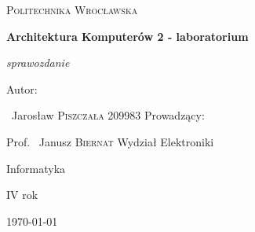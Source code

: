 ﻿%



\begin{titlepage}
\centering
	{\scshape\LARGE Politechnika Wrocławska \par}
	\vspace{6cm}
	{\huge\bfseries Architektura Komputerów 2 - laboratorium\par}
	\vspace{0.5cm}
	{\Large\itshape sprawozdanie\par}
    \vspace{2cm}
    \vfill
	Autor:\par
	~Jarosław \textsc{Piszczała} 209983
	\vfill
	Prowadzący:\par
	Prof. ~Janusz \textsc{Biernat}
	\vfill
   Wydział Elektroniki\par
   Informatyka\par
   IV rok
   \vfill

	{\large \today\par}
\end{titlepage}


